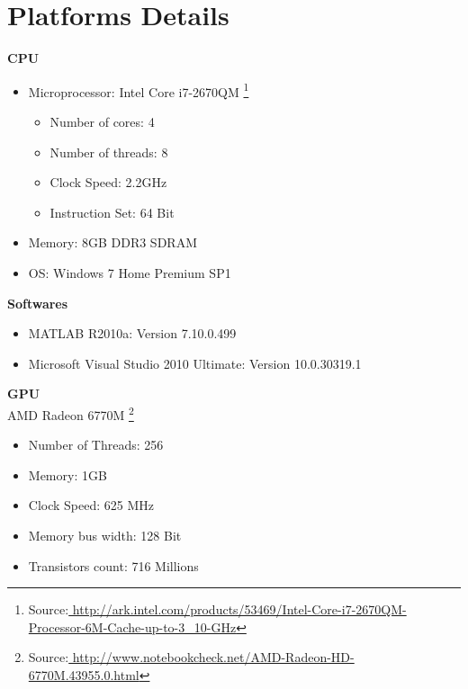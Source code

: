 
\chapter{Platforms Details} %

\label{AppendixB} %



\textbf{CPU}
\begin{itemize}
\item Microprocessor: Intel Core i7-2670QM \footnote{Source:\url{ http://ark.intel.com/products/53469/Intel-Core-i7-2670QM-Processor-6M-Cache-up-to-3_10-GHz}}
	\begin{itemize}
	\item Number of cores:  4
	\item Number of threads: 8
	\item Clock Speed: 2.2GHz
	\item Instruction Set: 64 Bit
	\end{itemize}
\item Memory: 8GB DDR3 SDRAM
\item OS: Windows 7 Home Premium SP1
\end{itemize}
\textbf{Softwares}
\begin{itemize}
\item MATLAB R2010a: Version 7.10.0.499
\item Microsoft Visual Studio 2010 Ultimate: Version 10.0.30319.1 
\end{itemize}

\textbf{GPU}\\
AMD Radeon  6770M \footnote{Source:\url{ http://www.notebookcheck.net/AMD-Radeon-HD-6770M.43955.0.html}}
\begin{itemize}
\item Number of Threads: 256
\item Memory: 1GB
\item Clock Speed: 625 MHz
\item Memory bus width: 128 Bit
\item Transistors count: 716 Millions
\end{itemize}
